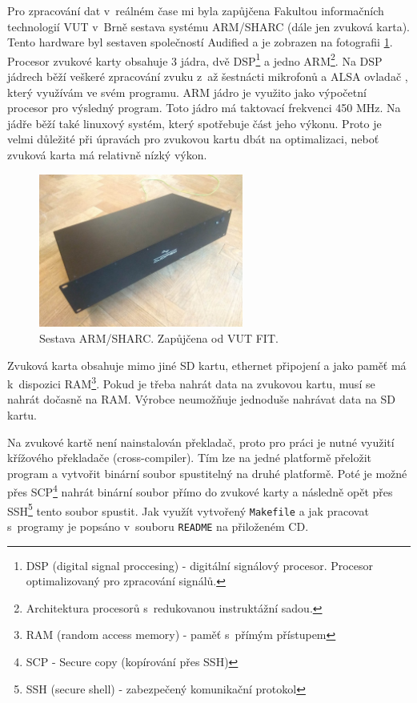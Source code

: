 Pro zpracování dat v~reálném čase mi byla zapůjčena Fakultou informačních technologií VUT v~Brně sestava systému ARM/SHARC (dále jen zvuková karta). Tento hardware byl sestaven společností Audified a je zobrazen na fotografii \ref{pic:zvukovka}. Procesor zvukové karty obsahuje 3 jádra, dvě DSP\footnote{DSP (digital signal proccesing) - digitální signálový procesor. Procesor optimalizovaný pro zpracování signálů.} a jedno ARM\footnote{Architektura procesorů s~redukovanou instruktážní sadou.}. Na DSP jádrech běží veškeré zpracování zvuku z~až šestnácti mikrofonů a ALSA ovladač \cite{alsa}, který využívám ve svém programu. ARM jádro je využito jako výpočetní procesor pro výsledný program. Toto jádro má taktovací frekvenci 450 MHz. Na jádře běží také linuxový systém, který spotřebuje část jeho výkonu. Proto je velmi důležité při úpravách pro zvukovou kartu dbát na optimalizaci, neboť zvuková karta má relativně nízký výkon. 

\begin{figure}[!hbt]
	\centering
	\includegraphics[width=0.6\textwidth]{obrazky-figures/zvukovka.jpg}
	\caption{Sestava ARM/SHARC. Zapůjčena od VUT FIT.}
	\label{pic:zvukovka}
\end{figure}

Zvuková karta obsahuje mimo jiné SD kartu, ethernet připojení a jako paměť má k~dispozici RAM\footnote{RAM (random access memory) - paměť s~přímým přístupem}. Pokud je třeba nahrát data na zvukovou kartu, musí se nahrát dočasně na RAM. Výrobce neumožňuje jednoduše nahrávat data na SD kartu.

Na zvukové kartě není nainstalován překladač, proto pro práci je nutné využití křížového překladače (cross-compiler). Tím lze na jedné platformě přeložit program a vytvořit binární soubor spustitelný na druhé platformě. Poté je možné přes SCP\footnote{SCP - Secure copy (kopírování přes SSH)} nahrát binární soubor přímo do zvukové karty a následně opět přes SSH\footnote{SSH (secure shell) - zabezpečený komunikační protokol} tento soubor spustit. Jak využít vytvořený \texttt{Makefile} a jak pracovat s~programy je popsáno v~souboru \texttt{README} na přiloženém CD.
\newpage
